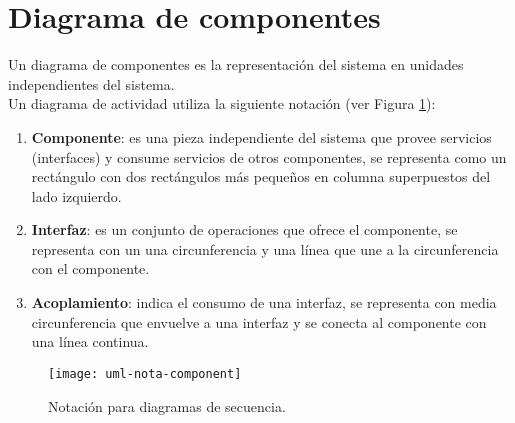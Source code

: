 \section{Diagrama de componentes}\label{sec-uml-comp}
Un diagrama de componentes es la representación del sistema en unidades independientes del sistema\cite{UMLClassroom, SoftwareEngineeringUML}.\\
Un diagrama de actividad utiliza la siguiente notación\cite{UMLClassroom, SoftwareEngineeringUML} (ver Figura \ref{fig:uml-nota-component}):
\begin{enumerate}
  \item \textbf{Componente}: es una pieza independiente del sistema que provee servicios (interfaces) y consume servicios de otros componentes, se representa como un rectángulo con dos rectángulos más pequeños en columna superpuestos del lado izquierdo.
  \item \textbf{Interfaz}: es un conjunto de operaciones que ofrece el componente, se representa con un una circunferencia y una línea que une a la circunferencia con el componente.
  \item \textbf{Acoplamiento}: indica el consumo de una interfaz, se representa con media circunferencia que envuelve a una interfaz y se conecta al componente con una línea continua.
\end{enumerate}

\begin{figure}[h]
  \centering
  \texttt{[image: uml-nota-component]}
  \caption{Notación para diagramas de secuencia\cite{SoftwareEngineeringUML}.}
  \label{fig:uml-nota-component}
\end{figure}

